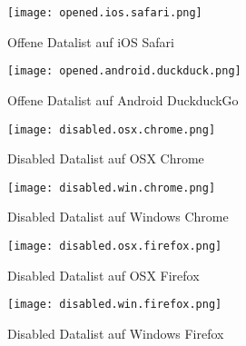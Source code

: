 \begin{figure}[!htb]
    \centering
    \begin{minipage}[b]{0.45\textwidth}
        \centering
        \texttt{[image: opened.ios.safari.png]}
        \caption{Offene Datalist auf iOS Safari}
        \label{img:openedIosSafariDatalist}
    \end{minipage}
    \hfill
    \begin{minipage}[b]{0.45\textwidth}
        \centering
        \texttt{[image: opened.android.duckduck.png]}
        \caption{Offene Datalist auf Android DuckduckGo}
        \label{img:openedAndroidDuckduckDatalist}
    \end{minipage}
\end{figure}


\begin{figure}[!htb]
    \centering
    \begin{minipage}[b]{0.45\textwidth}
        \centering
        \texttt{[image: disabled.osx.chrome.png]}
        \caption{Disabled Datalist auf OSX Chrome}
        \label{img:disabledOsxChromeDatalist}
    \end{minipage}
    \hfill
    \begin{minipage}[b]{0.45\textwidth}
        \centering
        \texttt{[image: disabled.win.chrome.png]}
        \caption{Disabled Datalist auf Windows Chrome}
        \label{img:disabledWinChromeDatalist}
    \end{minipage}
\end{figure}

\begin{figure}[!htb]
    \centering
    \begin{minipage}[b]{0.45\textwidth}
        \centering
        \texttt{[image: disabled.osx.firefox.png]}
        \caption{Disabled Datalist auf OSX Firefox}
        \label{img:disabledOsxFirefoxDatalist}
    \end{minipage}
    \hfill
    \begin{minipage}[b]{0.45\textwidth}
        \centering
        \texttt{[image: disabled.win.firefox.png]}
        \caption{Disabled Datalist auf Windows Firefox}
        \label{img:disabledWinFirefoxDatalist}
    \end{minipage}
\end{figure}

